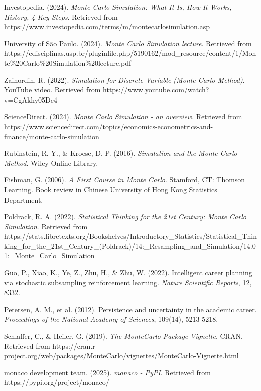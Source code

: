 \documentclass[main.tex]{subfiles}
\begin{document}
\begin{thebibliography}{20}

Investopedia. (2024). \textit{Monte Carlo Simulation: What It Is, How It Works, History, 4 Key Steps}. Retrieved from https://www.investopedia.com/terms/m/montecarlosimulation.asp

University of São Paulo. (2024). \textit{Monte Carlo Simulation lecture}. Retrieved from https://edisciplinas.usp.br/pluginfile.php/5190162/mod\_resource/content/1/Monte\%20Carlo\%20Simulation\%20lecture.pdf

Zainordin, R. (2022). \textit{Simulation for Discrete Variable (Monte Carlo Method)}. YouTube video. Retrieved from https://www.youtube.com/watch?v=CgAkhy05De4

ScienceDirect. (2024). \textit{Monte Carlo Simulation - an overview}. Retrieved from https://www.sciencedirect.com/topics/economics-econometrics-and-finance/monte-carlo-simulation

Rubinstein, R. Y., \& Kroese, D. P. (2016). \textit{Simulation and the Monte Carlo Method}. Wiley Online Library.

Fishman, G. (2006). \textit{A First Course in Monte Carlo}. Stamford, CT: Thomson Learning. Book review in Chinese University of Hong Kong Statistics Department.

Poldrack, R. A. (2022). \textit{Statistical Thinking for the 21st Century: Monte Carlo Simulation}. Retrieved from https://stats.libretexts.org/Bookshelves/Introductory\_Statistics/Statistical\_Thinking\_for\_the\_21st\_Century\_(Poldrack)/14:\_Resampling\_and\_Simulation/14.01:\_Monte\_Carlo\_Simulation

Guo, P., Xiao, K., Ye, Z., Zhu, H., \& Zhu, W. (2022). Intelligent career planning via stochastic subsampling reinforcement learning. \textit{Nature Scientific Reports}, 12, 8332.

Petersen, A. M., et al. (2012). Persistence and uncertainty in the academic career. \textit{Proceedings of the National Academy of Sciences}, 109(14), 5213-5218.

Schlaffer, C., \& Heiler, G. (2019). \textit{The MonteCarlo Package Vignette}. CRAN. Retrieved from https://cran.r-project.org/web/packages/MonteCarlo/vignettes/MonteCarlo-Vignette.html

monaco development team. (2025). \textit{monaco - PyPI}. Retrieved from https://pypi.org/project/monaco/


\end{thebibliography}
\end{document}
